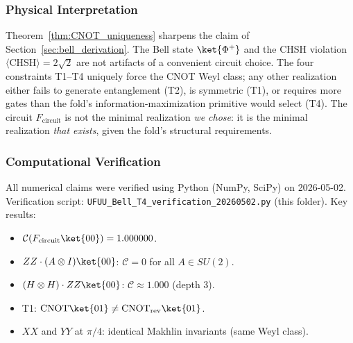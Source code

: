 \subsubsection*{Physical Interpretation}

Theorem~\ref{thm:CNOT_uniqueness} sharpens the claim of
Section~\ref{sec:bell_derivation}. The Bell state $\ket{\Phi^+}$
and the CHSH violation $\langle\mathrm{CHSH}\rangle = 2\sqrt{2}$
are not artifacts of a convenient circuit choice. The four constraints
T1--T4 uniquely force the CNOT Weyl class; any other realization
either fails to generate entanglement (T2), is symmetric (T1), or
requires more gates than the fold's information-maximization primitive
would select (T4). The circuit $F_{\mathrm{circuit}}$ is not the
minimal realization \emph{we chose}: it is the minimal realization
\emph{that exists}, given the fold's structural requirements.

\subsubsection*{Computational Verification}

All numerical claims were verified using Python (NumPy, SciPy) on
2026-05-02. Verification script:
\texttt{UFUU\_Bell\_T4\_verification\_20260502.py} (this folder).
Key results:
\begin{itemize}
    \item $\mathcal{C}(F_{\mathrm{circuit}}\ket{00}) = 1.000000$.
    \item $ZZ\cdot(A\otimes I)\ket{00}$: $\mathcal{C} = 0$ for all $A \in SU(2)$.
    \item $(H\otimes H)\cdot ZZ\ket{00}$: $\mathcal{C} \approx 1.000$ (depth 3).
    \item T1: $\mathrm{CNOT}\ket{01} \neq \mathrm{CNOT}_{\mathrm{rev}}\ket{01}$.
    \item $XX$ and $YY$ at $\pi/4$: identical Makhlin invariants (same Weyl class).
\end{itemize}

%
%
%

% 
